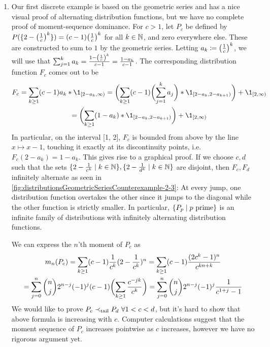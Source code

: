 \documentclass[a4paper]{scrreprt}
\begin{document}
\begin{ex}
        \begin{enumerate}
            \item
            \label{item:geometricSeriesSufficientTailOrderConditionCounterexample}
            Our first discrete example is based on the geometric series and has a nice visual proof of alternating distribution functions, but we have no complete proof of moment-sequence dominance.
            For $c > 1$, let $P_c$ be defined by $P(\{2-\bigl(\frac{1}{c}\bigr)^k\}) = (c-1)\bigl(\frac{1}{c}\bigr)^k$ for all $k \in \mathbb{N}$, and zero everywhere else.
            These are constructed to sum to $1$ by the geometric series.
            Letting $a_k \coloneqq \bigl(\frac{1}{c}\bigr)^k$, we will use that $\sum_{j = 1}^k  a_k = \frac{1 - \left(\frac{1}{c}\right)^k}{c - 1} = \frac{1 - a_k}{c - 1}$.
            The corresponding distribution function $F_c$ comes out to be 
            \begin{multline*}
                F_c 
                = \sum_{k \geq 1} (c-1) a_k * \1_{[2-a_k, \infty)}
                = \biggpars{\sum_{k \geq 1} (c-1) \biggpars{\sum_{j = 1}^k  a_j} * \1_{[2-a_k, 2-a_{k+1})}} + \1_{[2, \infty)} \\
                = \biggpars{\sum_{k \geq 1} (1-a_k) * \1_{[2-a_k, 2-a_{k+1})}} + \1_{[2, \infty)}
            \end{multline*}
            In particular, on the interval [1, 2], $F_c$ is bounded from above by the line $x \mapsto x-1$, touching it exactly at its discontinuity points, i.e. $F_c(2-a_k) = 1-a_k$. This gives rise to a graphical proof.
            If we choose $c, d$ such that the sets $\{2 - \frac{1}{c^k} \mid k \in \mathbb{N}\}, \{2 - \frac{1}{d^k} \mid k \in \mathbb{N}\}$ are disjoint,
            then $F_c, F_d$ infinitely alternate as seen in \autoref{fig:distributionsGeometricSeriesCounterexample-2-3}:
            At every jump, one distribution function overtakes the other since it jumps to the diagonal while the other function is strictly smaller.
            In particular, $\{P_p \mid p \text{ prime}\}$ is an infinite family of distributions with infinitely alternating distribution functions.
            
            We can express the $n$'th moment of $P_c$ as
            \begin{multline*}
                m_n(P_c) 
                = \sum_{k \geq 1} (c-1) \frac{1}{c^k} (2-\frac{1}{c^k})^n
                = \sum_{k \geq 1} (c-1) \frac{(2c^k-1)^n}{c^{kn+k}} \\
                = \sum_{j=0}^n \binom{n}{j}2^{n-j}(-1)^j (c-1)\biggl(\sum_{k \geq 1}\frac{c^{-jk}}{c^k}\biggr)
                = \sum_{j=0}^n \binom{n}{j}2^{n-j}(-1)^j \frac{1}{c^{1+j}-1}
            \end{multline*}
            We would like to prove $P_c \prec_{\text{tail}} P_d ~ \forall 1 < c < d$, but it's hard to show that above formula is increasing with $c$.
            Computer calculations suggest that the moment sequence of $P_c$ increases pointwise as $c$ increases, however we have no rigorous argument yet.
          

\end{enumerate}
\end{ex}
\end{document}
